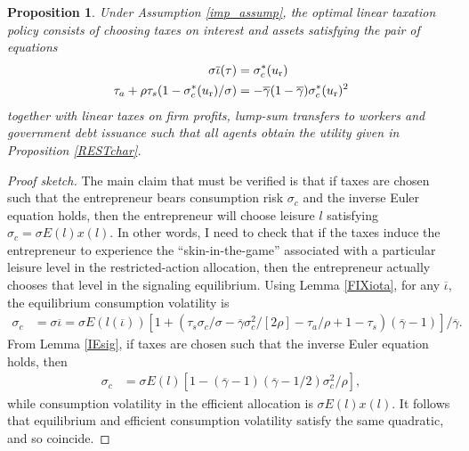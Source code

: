 \documentclass[11pt]{article}
\theoremstyle{plain}
\newtheorem{prop}[thm]{Proposition}
\begin{document}
\begin{prop}\label{linTAXmain}
Under Assumption \ref{imp_assump}, the optimal linear taxation policy consists of choosing taxes on interest and assets satisfying the pair of equations
\begin{align*}
\sigma \overline{\iota}(\tau) & = \sigma_c^*(u_{\textnormal{r}})
\\ \tau_a + \rho\tau_s(1 - \sigma_c^*(u_{\textnormal{r}})/\sigma) & = -\overline{\gamma}(1-\overline{\gamma}) \sigma_c^*(u_{\textnormal{r}})^2
\end{align*}
together with linear taxes on firm profits, lump-sum transfers to workers and government debt issuance such that all agents obtain the utility given in Proposition \ref{RESTchar}. 
\end{prop}

\begin{proof}[Proof sketch]
The main claim that must be verified is that if taxes are chosen such that the entrepreneur bears consumption risk $\sigma_c$ and the inverse Euler equation holds, then the entrepreneur will choose leisure $l$ satisfying $\sigma_c = \sigma E(l) x(l)$. In other words, I need to check that if the taxes induce the entrepreneur to experience the ``skin-in-the-game'' associated with a particular leisure level in the restricted-action allocation, then the entrepreneur actually chooses that level in the signaling equilibrium. Using Lemma \ref{FIXiota}, for any $\overline{\iota}$, the equilibrium consumption volatility is
\begin{align*}
\sigma_c & = \sigma \overline{\iota} = \sigma E(l(\overline{\iota}))[1 + {\left(\tau_s\sigma_c/\sigma - \overline{\gamma}\sigma_c^2/[2\rho] - \tau_a/\rho + 1-\tau_s\right)}(\overline{\gamma}-1)]/\overline{\gamma}.
\end{align*}
From Lemma \ref{IEsig}, if taxes are chosen such that the inverse Euler equation holds, then
\begin{align*}
\sigma_c & %
 = \sigma E(l) {\left[ 1 - (\overline{\gamma} - 1)(\overline{\gamma} - 1/2)\sigma_c^2/\rho\right]},
\end{align*}
while consumption volatility in the efficient allocation is $\sigma E(l)x(l)$. It follows that equilibrium and efficient consumption volatility satisfy the same quadratic, and so coincide. 
\end{proof}
\end{document}
